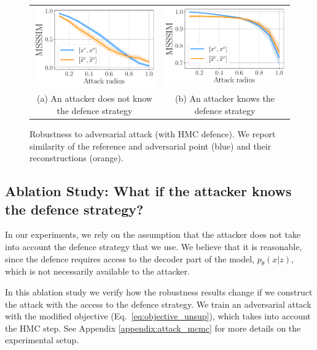{%
\begin{figure}[t]
    \centering
    \begin{tabular}{cc}
     \includegraphics[width=0.4\linewidth]{pics/3_adv_att/attack_mcmc_0_100.pdf} &
     \includegraphics[width=0.4\linewidth]{pics/3_adv_att/attack_mcmc_1_100.pdf} \\
     \multirow{2}{0.45\linewidth}{\centering \small (a) An attacker does not know the defence strategy}&
     \multirow{2}{0.45\linewidth}{\centering \small (b) An attacker knows the defence strategy }\\
     \\
    \end{tabular}
    \caption{Robustness to adversarial attack (with HMC defence). We report similarity of the reference and adversarial point (blue) and their reconstructions (orange).}
    \label{fig:attack_mcmc}
	\vspace*{\baselineskip}
\end{figure}



\subsection{Ablation Study: What if the attacker knows the defence strategy?} \label{sec:ablation}
In our experiments, we rely on the assumption that the attacker does not take into account the defence strategy that we use. We believe that it is reasonable, since the defence requires access to the decoder part of the model, $p_{\theta}(x|z)$, which is not necessarily available to the attacker. 

In this ablation study we verify how the robustness results change if we construct the attack with the access to the defence strategy. We train an adversarial attack with the modified objective (Eq.~\ref{eq:objective_unsup}), which takes into account the HMC step. See Appendix \ref{appendix:attack_mcmc} for more details on the experimental setup. 

}
